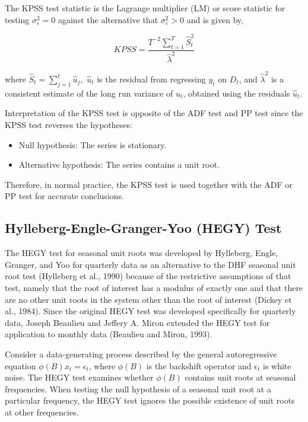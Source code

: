 \documentclass[12pt]{article}
\begin{document}
The KPSS test statistic is the Lagrange multiplier (LM) or score statistic for testing $\sigma^2_{\varepsilon} = 0$ against the alternative that $\sigma^2_{\varepsilon} > 0$ and is given by,

\[
	KPSS = \frac{T^{-2} \sum_{t=1}^{T} \hat{S}_t^2}{\hat{\lambda}^2}
\]

\noindent where $\hat{S}_t = \sum_{j=1}^{t} \hat{u}_j,$
$\hat{u}_t$ is the residual from regressing $y_t$ on $D_t$, and $\hat{\lambda}^2$ is a consistent estimate of the long run variance of $u_t$, obtained using the residuals $\hat{u}_t$.

\vspace{0.75cm}

Interpretation of the KPSS test is opposite of the ADF test and PP test since the KPSS test reverses the hypotheses:

\begin{itemize}
	\item Null hypothesis: The series is stationary.
	\item Alternative hypothesis: The series contains a unit root.
\end{itemize}

\noindent Therefore, in normal practice, the KPSS test is used together with the ADF or PP test for accurate conclusions.

\subsection{Hylleberg-Engle-Granger-Yoo (HEGY) Test}

The HEGY test for seasonal unit roots was developed by Hylleberg, Engle, Granger, and Yoo for quarterly data as an alternative to the DHF seasonal unit root test (Hylleberg et al., 1990) because of the restrictive assumptions of that test, namely that the root of interest has a modulus of exactly one and that there are no other unit roots in the system other than the root of interest (Dickey et al., 1984). Since the original HEGY test was developed specifically for quarterly data, Joseph Beaulieu and Jeffery A. Miron extended the HEGY test for application to monthly data (Beaulieu and Miron, 1993).

\vspace{0.75cm}

 Consider a data-generating process described by the general autoregressive equation \(\phi(B)x_t=\epsilon_t\), where \(\phi(B)\) is the backshift operator and \(\epsilon_t\) is white noise. The HEGY test examines whether \(\phi(B)\) contains unit roots at seasonal frequencies. When testing the null hypothesis of a seasonal unit root at a particular frequency, the HEGY test ignores the possible existence of unit roots at other frequencies. 
 
\end{document}
